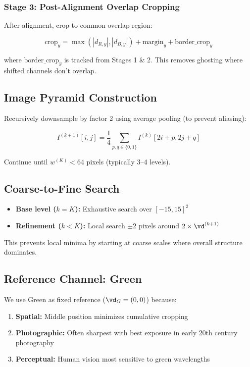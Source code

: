 {\subsubsection{Stage 3: Post-Alignment Overlap Cropping}

After alignment, crop to common overlap region:

\begin{equation}
\text{crop}_y = \max(|d_{R,y}|, |d_{B,y}|) + \text{margin}_y + \text{border\_crop}_y
\end{equation}

where $\text{border\_crop}_y$ is tracked from Stages 1 \& 2. This removes ghosting where shifted channels don't overlap.

\subsection{Image Pyramid Construction}

Recursively downsample by factor 2 using average pooling (to prevent aliasing):

\begin{equation}
I^{(k+1)}[i,j] = \frac{1}{4}\sum_{p,q \in \{0,1\}} I^{(k)}[2i+p, 2j+q]
\end{equation}

Continue until $w^{(K)} < 64$ pixels (typically 3--4 levels).

\subsection{Coarse-to-Fine Search}

\begin{itemize}
\item \textbf{Base level ($k=K$):} Exhaustive search over $[-15, 15]^2$
\item \textbf{Refinement ($k < K$):} Local search $\pm 2$ pixels around $2 \times \vd^{(k+1)}$
\end{itemize}

This prevents local minima by starting at coarse scales where overall structure dominates.

\subsection{Reference Channel: Green}

We use Green as fixed reference ($\vd_G = (0,0)$) because:
\begin{enumerate}
\item \textbf{Spatial:} Middle position minimizes cumulative cropping
\item \textbf{Photographic:} Often sharpest with best exposure in early 20th century photography
\item \textbf{Perceptual:} Human vision most sensitive to green wavelengths
\end{enumerate}

}

